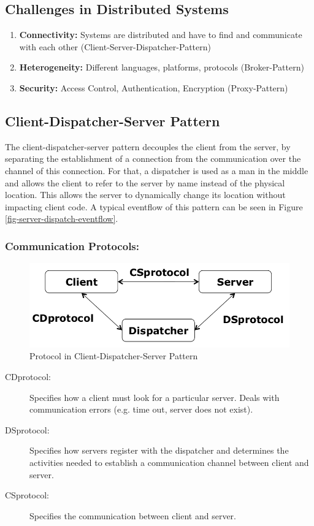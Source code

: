 \subsection{Challenges in Distributed Systems}
\begin{enumerate}
	\item \textbf{Connectivity:} Systems are distributed and have to find and communicate with each other (Client-Server-Dispatcher-Pattern)
	\item \textbf{Heterogeneity:} Different languages, platforms, protocols (Broker-Pattern)
	\item \textbf{Security:} Access Control, Authentication, Encryption (Proxy-Pattern)
\end{enumerate}

\subsection{Client-Dispatcher-Server Pattern}
The client-dispatcher-server pattern decouples the client from the server, by separating the establishment of a connection from the communication over the channel of this connection.
For that, a dispatcher is used as a man in the middle and allows the client to refer to the server by name instead of the physical location.
This allows the server to dynamically change its location without impacting client code.
A typical eventflow of this pattern can be seen in Figure \ref{fig-server-dispatch-eventflow}.

\subsubsection*{Communication Protocols:}
\begin{figure}[H]
	\centering
	\includegraphics[width=0.7\linewidth]{images/protocol_dispatcher.png}
	\caption{Protocol in Client-Dispatcher-Server Pattern}
\end{figure}
\begin{description}
  \item[CDprotocol:] Specifies how a client must look for a particular server.
  Deals with communication errors (e.g. time out, server does not exist).
  \item[DSprotocol:] Specifies how servers register with the dispatcher and
  determines the activities needed to establish a communication
  channel between client and server.
  \item[CSprotocol:] Specifies the communication between client and server.
\end{description}

